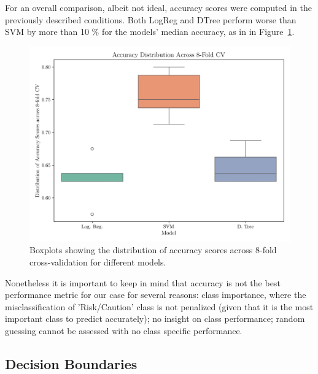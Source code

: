 \documentclass[conference]{IEEEtran}
\begin{document}

For an overall comparison, albeit not ideal,  accuracy scores were computed in the previously described conditions. Both LogReg and DTree perform worse than SVM by more than 10 \% for the models' median accuracy, as in in Figure~\ref{box_accuracy}. 

\begin{figure}[H]
    \centering
    \includegraphics[width=1\linewidth]{assets/box_accuracy.png}
    \caption{Boxplots showing the distribution of accuracy scores across 8-fold cross-validation for different models.}
    \label{box_accuracy}
\end{figure} %

Nonetheless it is important to keep in mind that accuracy is not the best performance metric for our case for several reasons: class importance, where the misclassification of 'Risk/Caution' class is not penalized (given that it is the most important class to predict accurately); no insight on class performance; random guessing cannot be assessed with no class specific performance.

\subsection{Decision Boundaries}
\end{document}
